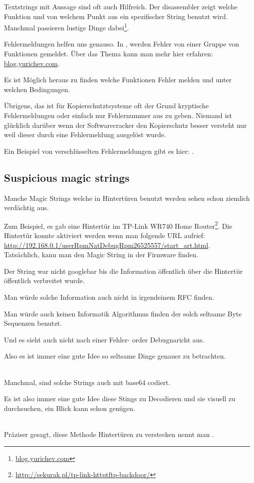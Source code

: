 Textstrings mit Aussage sind oft auch Hilfreich. %
Der \IDA disassembler zeigt welche Funktion und von welchem Punkt aus ein spezifischer String benutzt wird.
Manchmal passieren lustige Dinge dabei\footnote{\href{http://go.yurichev.com/17223}{blog.yurichev.com}}.

Fehlermeldungen helfen uns genauso.
In \oracle, werden Fehler von einer Gruppe von Funktionen gemeldet.
Über das Thema kann man mehr hier erfahren: \href{http://go.yurichev.com/17224}{blog.yurichev.com}.


Es ist Möglich heraus zu finden welche Funktionen Fehler melden und unter welchen Bedingungen.


Übrigens, das ist für Kopierschutztsysteme oft der Grund kryptische Fehlermeldungen oder einfach nur 
Fehlernummer aus zu geben. Niemand ist glücklich darüber wenn der Softwarecracker den Kopierschutz besser
versteht nur weil dieser durch eine Fehlermeldung ausgelöst wurde.

Ein Beispiel von verschlüsselten Fehlermeldungen gibt es hier: .

\subsection{Suspicious magic strings}

Manche Magic Strings welche in Hintertüren benutzt werden sehen schon ziemlich verdächtig aus.


Zum Beispiel, es gab eine Hintertür im TP-Link WR740 Home Router\footnote{\url{http://sekurak.pl/tp-link-httptftp-backdoor/}}.
Die Hintertür konnte aktiviert werden wenn man folgende URL aufrief:
\url{http://192.168.0.1/userRpmNatDebugRpm26525557/start_art.html}.\\

Tatsächlich, kann man den Magic String  in der Firmware finden.

Der String war nicht googlebar bis die Information öffentlich über die Hintertür öffentlich verbreitet wurde.


Man würde solche Information auch nicht in irgendeinem \ac{RFC} finden. %


Man würde auch keinen Informatik Algorithmus finden der solch seltsame Byte Sequenzen benutzt.


Und es sieht auch nicht nach einer Fehler- order Debugnaricht aus.


Also es ist immer eine gute Idee so seltsame Dinge genauer zu betrachten.\\
\\

Manchmal, sind solche Strings auch mit base64 codiert.

Es ist also immer eine gute Idee diese Stings zu Decodieren und sie visuell zu durchsuchen, ein Blick
kann schon genügen.

\\
Präziser gesagt, diese Methode Hintertüren zu verstecken nennt man .


